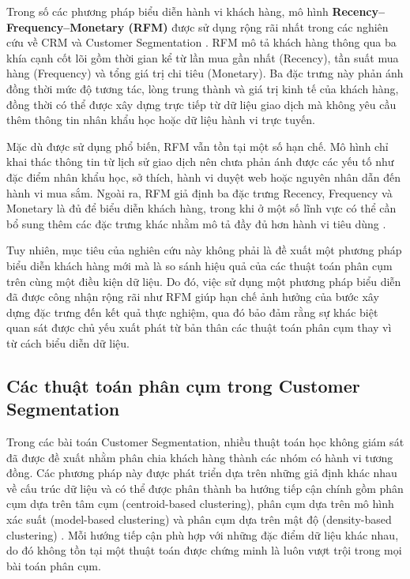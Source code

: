\documentclass[12pt]{ai_conquer2026}
\begin{document}
Trong số các phương pháp biểu diễn hành vi khách hàng, mô hình \textbf{Recency--Frequency--Monetary (RFM)} được sử dụng rộng rãi nhất trong các nghiên cứu về CRM và Customer Segmentation \cite{Hughes1994,Gomes2023}. RFM mô tả khách hàng thông qua ba khía cạnh cốt lõi gồm thời gian kể từ lần mua gần nhất (Recency), tần suất mua hàng (Frequency) và tổng giá trị chi tiêu (Monetary). Ba đặc trưng này phản ánh đồng thời mức độ tương tác, lòng trung thành và giá trị kinh tế của khách hàng, đồng thời có thể được xây dựng trực tiếp từ dữ liệu giao dịch mà không yêu cầu thêm thông tin nhân khẩu học hoặc dữ liệu hành vi trực tuyến.

Mặc dù được sử dụng phổ biến, RFM vẫn tồn tại một số hạn chế. Mô hình chỉ khai thác thông tin từ lịch sử giao dịch nên chưa phản ánh được các yếu tố như đặc điểm nhân khẩu học, sở thích, hành vi duyệt web hoặc nguyên nhân dẫn đến hành vi mua sắm. Ngoài ra, RFM giả định ba đặc trưng Recency, Frequency và Monetary là đủ để biểu diễn khách hàng, trong khi ở một số lĩnh vực có thể cần bổ sung thêm các đặc trưng khác nhằm mô tả đầy đủ hơn hành vi tiêu dùng \cite{Gomes2023}.

Tuy nhiên, mục tiêu của nghiên cứu này không phải là đề xuất một phương pháp biểu diễn khách hàng mới mà là so sánh hiệu quả của các thuật toán phân cụm trên cùng một điều kiện dữ liệu. Do đó, việc sử dụng một phương pháp biểu diễn đã được công nhận rộng rãi như RFM giúp hạn chế ảnh hưởng của bước xây dựng đặc trưng đến kết quả thực nghiệm, qua đó bảo đảm rằng sự khác biệt quan sát được chủ yếu xuất phát từ bản thân các thuật toán phân cụm thay vì từ cách biểu diễn dữ liệu.

\subsection{Các thuật toán phân cụm trong Customer Segmentation}

Trong các bài toán Customer Segmentation, nhiều thuật toán học không giám sát đã được đề xuất nhằm phân chia khách hàng thành các nhóm có hành vi tương đồng. Các phương pháp này được phát triển dựa trên những giả định khác nhau về cấu trúc dữ liệu và có thể được phân thành ba hướng tiếp cận chính gồm phân cụm dựa trên tâm cụm (centroid-based clustering), phân cụm dựa trên mô hình xác suất (model-based clustering) và phân cụm dựa trên mật độ (density-based clustering) \cite{Jain2010,Gomes2023}. Mỗi hướng tiếp cận phù hợp với những đặc điểm dữ liệu khác nhau, do đó không tồn tại một thuật toán được chứng minh là luôn vượt trội trong mọi bài toán phân cụm.
\end{document}
